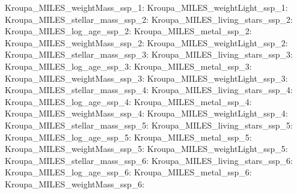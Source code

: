 Kroupa\_MILES\_weightMass\_ssp\_1:  \newline 
Kroupa\_MILES\_weightLight\_ssp\_1:  \newline 
Kroupa\_MILES\_stellar\_mass\_ssp\_2:  \newline 
Kroupa\_MILES\_living\_stars\_ssp\_2:  \newline 
Kroupa\_MILES\_log\_age\_ssp\_2:  \newline 
Kroupa\_MILES\_metal\_ssp\_2:  \newline 
Kroupa\_MILES\_weightMass\_ssp\_2:  \newline 
Kroupa\_MILES\_weightLight\_ssp\_2:  \newline 
Kroupa\_MILES\_stellar\_mass\_ssp\_3:  \newline 
Kroupa\_MILES\_living\_stars\_ssp\_3:  \newline 
Kroupa\_MILES\_log\_age\_ssp\_3:  \newline 
Kroupa\_MILES\_metal\_ssp\_3:  \newline 
Kroupa\_MILES\_weightMass\_ssp\_3:  \newline 
Kroupa\_MILES\_weightLight\_ssp\_3:  \newline 
Kroupa\_MILES\_stellar\_mass\_ssp\_4:  \newline 
Kroupa\_MILES\_living\_stars\_ssp\_4:  \newline 
Kroupa\_MILES\_log\_age\_ssp\_4:  \newline 
Kroupa\_MILES\_metal\_ssp\_4:  \newline 
Kroupa\_MILES\_weightMass\_ssp\_4:  \newline 
Kroupa\_MILES\_weightLight\_ssp\_4:  \newline 
Kroupa\_MILES\_stellar\_mass\_ssp\_5:  \newline 
Kroupa\_MILES\_living\_stars\_ssp\_5:  \newline 
Kroupa\_MILES\_log\_age\_ssp\_5:  \newline 
Kroupa\_MILES\_metal\_ssp\_5:  \newline 
Kroupa\_MILES\_weightMass\_ssp\_5:  \newline 
Kroupa\_MILES\_weightLight\_ssp\_5:  \newline 
Kroupa\_MILES\_stellar\_mass\_ssp\_6:  \newline 
Kroupa\_MILES\_living\_stars\_ssp\_6:  \newline 
Kroupa\_MILES\_log\_age\_ssp\_6:  \newline 
Kroupa\_MILES\_metal\_ssp\_6:  \newline 
Kroupa\_MILES\_weightMass\_ssp\_6:  \newline 
